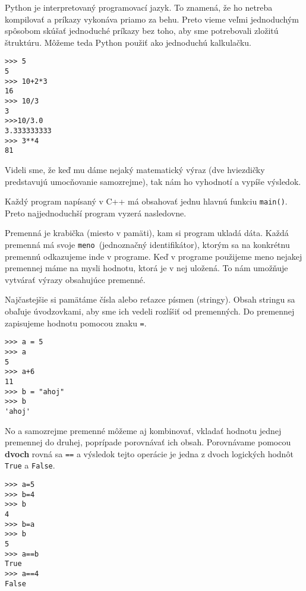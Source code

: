 




Python je interpretovaný programovací jazyk. To znamená, že ho netreba kompilovať a príkazy vykonáva priamo za behu.
Preto vieme veľmi jednoduchým spôsobom skúšať jednoduché príkazy bez toho, aby sme potrebovali zložitú štruktúru.
Môžeme teda Python použiť ako jednoduchú kalkulačku.

\begin{lstlisting}
>>> 5
5
>>> 10+2*3
16
>>> 10/3
3
>>>10/3.0
3.333333333
>>> 3**4
81
\end{lstlisting}

Videli sme, že keď mu dáme nejaký matematický výraz (dve hviezdičky predstavujú umocňovanie samozrejme), tak nám ho
vyhodnotí a vypíše výsledok.

Každý program napísaný v C++ má obsahovať jednu hlavnú funkciu \texttt{main()}. Preto najjednoduchší
program vyzerá nasledovne.


Premenná je krabička (miesto v pamäti), kam si program ukladá dáta. Každá premenná má svoje \texttt{meno} (jednoznačný
identifikátor), ktorým sa na konkrétnu premennú odkazujeme inde v programe. Keď v programe použijeme meno nejakej premennej
máme na mysli hodnotu, ktorá je v nej uložená. To nám umožňuje vytvárať výrazy obsahujúce premenné.

Najčastejšie si pamätáme čísla alebo reťazce písmen (stringy). Obsah stringu sa obaľuje úvodzovkami, aby sme ich vedeli rozlíšiť
od premenných. Do premennej zapisujeme hodnotu pomocou znaku \texttt{=}.

\begin{lstlisting}
>>> a = 5
>>> a
5
>>> a+6
11
>>> b = "ahoj"
>>> b
'ahoj'
\end{lstlisting}

No a samozrejme premenné môžeme aj kombinovať, vkladať hodnotu jednej premennej do druhej, poprípade porovnávať ich obsah.
Porovnávame pomocou \textbf{dvoch} rovná sa \texttt{==} a výsledok tejto operácie je jedna z dvoch logických hodnôt \texttt{True}
a \texttt{False}.

\begin{lstlisting}
>>> a=5
>>> b=4
>>> b
4
>>> b=a
>>> b
5
>>> a==b
True
>>> a==4
False
\end{lstlisting}


